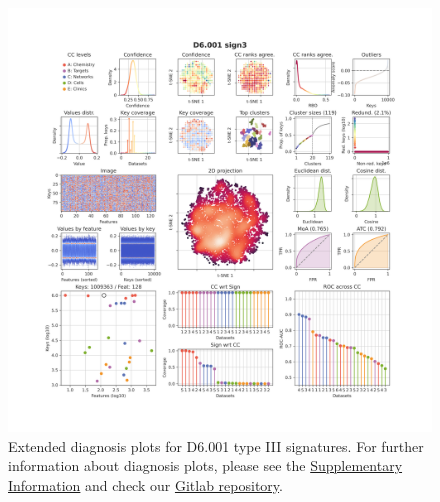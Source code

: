 \begin{figure}[htbp]
  \centering
  \includegraphics[width=1\linewidth]{figures/Protocols/Supplementary/D6.001_sign3_local_CC_D6_sign0_medium.png}
  \caption{
    Extended diagnosis plots for D6.001 type III signatures. For further information about diagnosis plots, please see the \hyperref[Supplementary_Protocols_Diagnosis]{Supplementary Information} and check our \href{https://gitlabsbnb.irbbarcelona.org/packages/protocols}{Gitlab repository}.
  }
  \label{Protocols_FigS8}
\end{figure}


